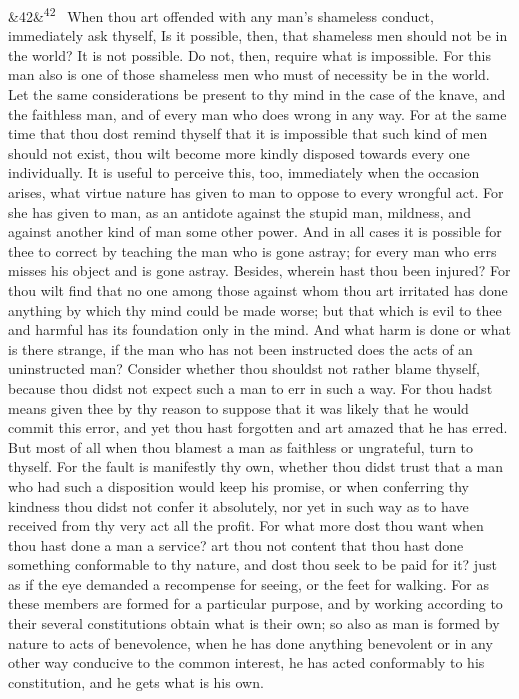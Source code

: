 \documentclass[12pt]{article}
\newcommand{\para}[1][]{\par\noindent\ifx&#1&\else\textsuperscript{\footnotesize #1}~\fi}
\begin{document}
\para[42] When thou art offended with any man's shameless conduct, immediately
ask thyself, Is it possible, then, that shameless men should not be in
the world? It is not possible. Do not, then, require what is impossible.
For this man also is one of those shameless men who must of necessity be
in the world. Let the same considerations be present to thy mind in the
case of the knave, and the faithless man, and of every man who does
wrong in any way. For at the same time that thou dost remind thyself
that it is impossible that such kind of men should not exist, thou wilt
become more kindly disposed towards every one individually. It is useful
to perceive this, too, immediately when the occasion arises, what virtue
nature has given to man to oppose to every wrongful act. For she has
given to man, as an antidote against the stupid man, mildness, and
against another kind of man some other power. And in all cases it is
possible for thee to correct by teaching the man who is gone astray; for
every man who errs misses his object and is gone astray. Besides,
wherein hast thou been injured? For thou wilt find that no one among
those against whom thou art irritated has done anything by which thy
mind could be made worse; but that which is evil to thee and harmful has
its foundation only in the mind. And what harm is done or what is there
strange, if the man who has not been instructed does the acts of an
uninstructed man? Consider whether thou shouldst not rather blame
thyself, because thou didst not expect such a man to err in such a way.
For thou hadst means given thee by thy reason to suppose that it was
likely that he would commit this error, and yet thou hast forgotten and
art amazed that he has erred. But most of all when thou blamest a man as
faithless or ungrateful, turn to thyself. For the fault is manifestly
thy own, whether thou didst trust that a man who had such a disposition
would keep his promise, or when conferring thy kindness thou didst not
confer it absolutely, nor yet in such way as to have received from thy
very act all the profit. For what more dost thou want when thou hast
done a man a service? art thou not content that thou hast done something
conformable to thy nature, and dost thou seek to be paid for it? just as
if the eye demanded a recompense for seeing, or the feet for walking.
For as these members are formed for a particular purpose, and by working
according to their several constitutions obtain what is their own; so
also as man is formed by nature to acts of benevolence, when he has done
anything benevolent or in any other way conducive to the common
interest, he has acted conformably to his constitution, and he gets what
is his own.
\end{document}
